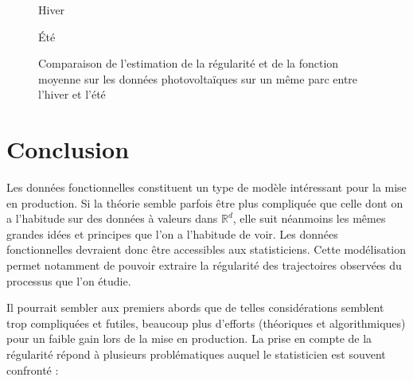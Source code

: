 \begin{figure}[H]
\begin{minipage}{0.48\textwidth}
	\end{minipage}
	\begin{minipage}{0.48\textwidth}
		\centering
		Hiver
	\end{minipage}
	\begin{minipage}{0.48\textwidth}
		\centering
		Été
	\end{minipage}
	\caption{Comparaison de l'estimation de la régularité et de la fonction moyenne sur les données photovoltaïques sur un même parc entre l'hiver et l'été}
	\label{fig:estim_reg_mu_hiv_ete}
\end{figure}


\chapter{Conclusion}

Les données fonctionnelles constituent un type de modèle intéressant pour la mise en production. Si la théorie semble parfois être plus compliquée que celle dont on a l'habitude sur des données à valeurs dans $\mathds R^d$, elle suit néanmoins les mêmes grandes idées et principes que l'on a l'habitude de voir. Les données fonctionnelles devraient donc être accessibles aux statisticiens. Cette modélisation permet notamment de pouvoir extraire la régularité des trajectoires observées du processus que l'on étudie. 

\bigskip

Il pourrait sembler aux premiers abords que de telles considérations semblent trop compliquées et futiles, beaucoup plus d'efforts (théoriques et algorithmiques) pour un faible gain lors de la mise en production. La prise en compte de la régularité répond à plusieurs problématiques auquel le statisticien est souvent confronté : 

